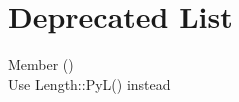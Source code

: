 \chapter{Deprecated List}
\hypertarget{deprecated}{}\label{deprecated}

\begin{DoxyRefList}
\item[Member \doxylink{struct_test_class_a86cd6a986e0ae4cae2bede5f8bf03d10}{Test\+Class\+::length} ()]\hfill \\
\label{deprecated__deprecated000001}%
%
Use Length\+::\+Py\+L() instead 
\end{DoxyRefList}